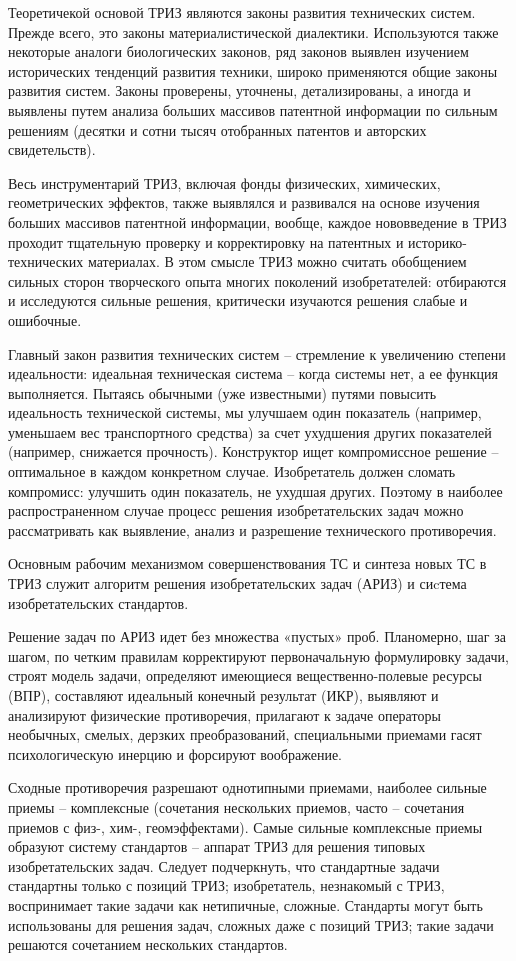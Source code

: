 \documentclass[11pt,a4paper]{article}
\begin{document}
Теоретичекой основой ТРИЗ являются законы развития технических систем. Прежде
всего, это законы материалистической диалектики. Используются также некоторые
аналоги биологических законов, ряд законов выявлен изучением исторических
тенденций развития техники, широко применяются общие законы развития систем.
Законы проверены, уточнены, детализированы, а иногда и выявлены путем анализа
больших массивов патентной информации по сильным решениям (десятки и сотни
тысяч отобранных патентов и авторских свидетельств).

Весь инструментарий ТРИЗ, включая фонды физических, химических, геометрических
эффектов, также выявлялся и развивался на основе изучения больших массивов
патентной информации, вообще, каждое нововведение в ТРИЗ проходит тщательную
проверку и корректировку на патентных и историко-технических материалах. В
этом смысле ТРИЗ можно считать обобщением сильных сторон творческого опыта
многих поколений изобретателей: отбираются и исследуются сильные решения,
критически изучаются решения слабые и ошибочные.

Главный закон развития технических систем -- стремление к увеличению степени
идеальности: идеальная техническая система -- когда системы нет, а ее функция
выполняется. Пытаясь обычными (уже известными) путями повысить идеальность
технической системы, мы улучшаем один показатель (например, уменьшаем вес
транспортного средства) за счет ухудшения других показателей (например,
снижается прочность). Конструктор ищет компромиссное решение -- оптимальное в
каждом конкретном случае. Изобретатель должен сломать компромисс: улучшить
один показатель, не ухудшая других. Поэтому в наиболее распространенном случае
процесс решения изобретательских задач можно рассматривать как выявление,
анализ и разрешение технического противоречия.

Основным рабочим механизмом совершенствования ТС и синтеза новых ТС в ТРИЗ
служит алгоритм решения изобретательских задач (АРИЗ) и сиcтема
изобретательских стандартов.

Решение задач по АРИЗ идет без множества «пустых» проб. Планомерно, шаг за
шагом, по четким правилам корректируют первоначальную формулировку задачи,
строят модель задачи, определяют имеющиеся вещественно-полевые ресурсы (ВПР),
составляют идеальный конечный результат (ИКР), выявляют и анализируют
физические противоречия, прилагают к задаче операторы необычных, смелых,
дерзких преобразований, специальными приемами гасят психологическую инерцию и
форсируют воображение.

Сходные противоречия разрешают однотипными приемами, наиболее сильные приемы
-- комплексные (сочетания нескольких приемов, часто -- сочетания приемов с
физ-, хим-, геомэффектами). Самые сильные комплексные приемы образуют систему
стандартов -- аппарат ТРИЗ для решения типовых изобретательских задач. Следует
подчеркнуть, что стандартные задачи стандартны только с позиций ТРИЗ;
изобретатель, незнакомый с ТРИЗ, воспринимает такие задачи как нетипичные,
сложные. Стандарты могут быть использованы для решения задач, сложных даже с
позиций ТРИЗ; такие задачи решаются сочетанием нескольких стандартов.
\end{document}
